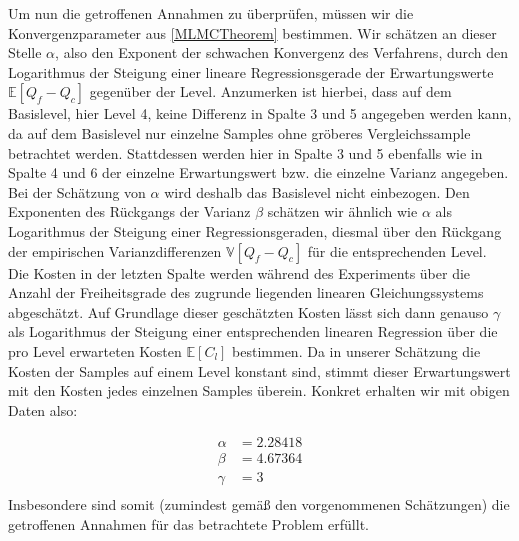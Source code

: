 Um nun die getroffenen Annahmen zu überprüfen, müssen wir die Konvergenzparameter aus \eqref{MLMCTheorem} bestimmen.
Wir schätzen an dieser Stelle $ \alpha $, also den Exponent der schwachen Konvergenz des Verfahrens, durch den Logarithmus der Steigung einer lineare Regressionsgerade der Erwartungswerte $ \mathbb{E}[Q_f - Q_c] $ gegenüber der Level. Anzumerken ist hierbei, dass auf dem Basislevel, hier Level 4, keine Differenz in Spalte 3 und 5 angegeben werden kann, da auf dem Basislevel nur einzelne Samples ohne gröberes Vergleichssample betrachtet werden. Stattdessen werden hier in Spalte 3 und 5 ebenfalls wie in Spalte 4 und 6 der einzelne Erwartungswert bzw. die einzelne Varianz angegeben. Bei der Schätzung von $ \alpha $ wird deshalb das Basislevel nicht einbezogen.
Den Exponenten des Rückgangs der Varianz $ \beta $ schätzen wir ähnlich wie $ \alpha $ als Logarithmus der Steigung einer Regressionsgeraden, diesmal über den Rückgang der empirischen Varianzdifferenzen  $ \mathbb{V}[Q_f-Q_c] $ für die entsprechenden Level. Die Kosten in der letzten Spalte werden während des Experiments über die Anzahl der Freiheitsgrade des zugrunde liegenden linearen Gleichungssystems abgeschätzt. 
Auf Grundlage dieser geschätzten Kosten lässt sich dann genauso $ \gamma $ als Logarithmus der Steigung einer entsprechenden linearen Regression über die pro Level erwarteten Kosten $ \mathbb{E}[C_l] $ bestimmen. Da in unserer Schätzung die Kosten der Samples auf einem Level konstant sind, stimmt dieser Erwartungswert mit den Kosten jedes einzelnen Samples überein.  
Konkret erhalten wir mit obigen Daten also: 

\begin{align*}
\alpha &=2.28418 \\
\beta &=4.67364 \\
\gamma &=  3\\
\end{align*}
Insbesondere sind somit (zumindest gemäß den vorgenommenen Schätzungen) die getroffenen Annahmen für das betrachtete Problem erfüllt.
